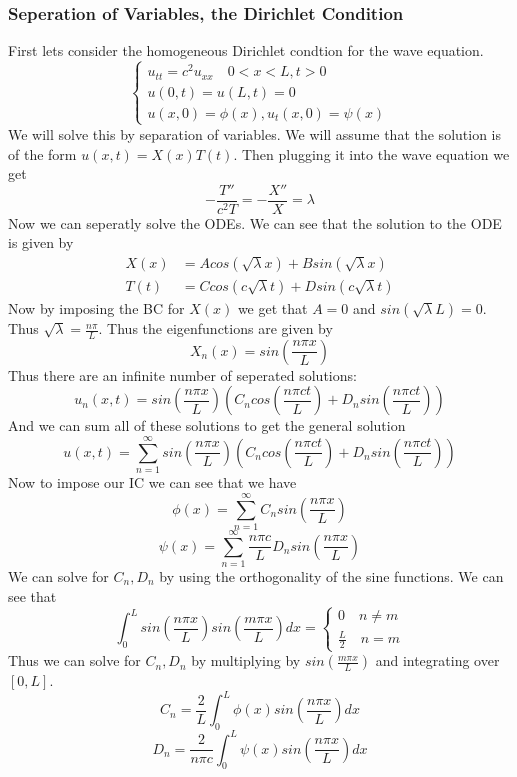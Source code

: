 \documentclass[answers,12pt,addpoints]{exam}
\begin{document}
    \subsubsection{Seperation of Variables, the Dirichlet Condition}
    First lets consider the homogeneous Dirichlet condtion for the wave equation. 
    $$ \begin{cases}
        u_{tt} = c^2 u_{xx} \quad 0 < x < L, t > 0\\
        u(0, t) = u(L, t) = 0\\
        u(x, 0) = \phi(x), u_t(x, 0) = \psi(x)
    \end{cases}$$
    We will solve this by separation of variables. We will assume that the solution is of the form $u(x, t) = X(x)T(t)$. 
    Then plugging it into the wave equation we get
    $$ -\frac{T''}{c^2 T} = -\frac{X''}{X} = \lambda$$
    Now we can seperatly solve the ODEs. We can see that the solution to the ODE is given by
    \begin{align*}
        X(x) &= A cos(\sqrt{\lambda} x) + B sin(\sqrt{\lambda} x)\\
        T(t) &= C cos(c \sqrt{\lambda} t) + D sin(c \sqrt{\lambda} t)
    \end{align*}
    Now by imposing the BC for $X(x)$ we get that $A = 0$ and $sin(\sqrt{\lambda} L) = 0$. Thus $\sqrt{\lambda} = \frac{n \pi}{L}$. Thus the eigenfunctions are given by
    $$ X_n(x) = sin(\frac{n \pi x}{L})$$
    Thus there are an infinite number of seperated solutions:
    $$ u_n(x, t) = sin(\frac{n \pi x}{L}) (C_n cos(\frac{n \pi c t}{L}) + D_n sin(\frac{n \pi c t}{L}))$$
    And we can sum all of these solutions to get the general solution
    $$u(x, t) = \sum_{n=1}^{\infty} sin(\frac{n \pi x}{L}) (C_n cos(\frac{n \pi c t}{L}) + D_n sin(\frac{n \pi c t}{L}))$$
    Now to impose our IC we can see that we have
    $$ \phi(x) = \sum_{n=1}^{\infty} C_n sin(\frac{n \pi x}{L})$$
    $$ \psi(x) = \sum_{n=1}^{\infty} \frac{n \pi c}{L} D_n sin(\frac{n \pi x}{L})$$
    We can solve for $C_n, D_n$ by using the orthogonality of the sine functions. We can see that
    $$ \int_{0}^{L} sin(\frac{n \pi x}{L}) sin(\frac{m \pi x}{L}) dx = \begin{cases}
        0 \quad n \neq m\\
        \frac{L}{2} \quad n = m
    \end{cases}$$
    Thus we can solve for $C_n, D_n$ by multiplying by $sin(\frac{m \pi x}{L})$ and integrating over $[0, L]$.
    $$ C_n = \frac{2}{L} \int_{0}^{L} \phi(x) sin(\frac{n \pi x}{L}) dx$$
    $$ D_n = \frac{2}{n \pi c} \int_{0}^{L} \psi(x) sin(\frac{n \pi x}{L}) dx$$
\end{document}
